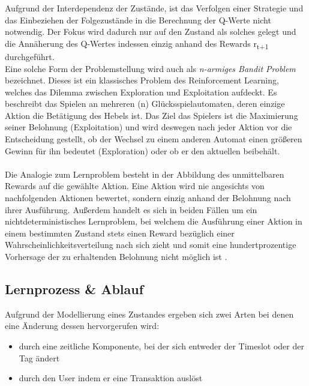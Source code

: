 Aufgrund der Interdependenz der Zustände, ist das Verfolgen einer Strategie und das Einbeziehen der Folgezustände in die Berechnung der Q-Werte nicht notwendig. Der Fokus wird dadurch nur auf den Zustand als solches gelegt und die Annäherung des  Q-Wertes indessen einzig anhand des Rewards r\textsubscript{t+1} durchgeführt. \\
Eine solche Form der Problemstellung wird auch als \textit{n-armiges Bandit Problem} bezeichnet. Dieses ist ein klassisches Problem des Reinforcement Learning, welches das Dilemma zwischen Exploration und Exploitation aufdeckt. Es beschreibt das Spielen an mehreren (n) Glücksspielautomaten, deren einzige Aktion die Betätigung des Hebels ist. Das Ziel das Spielers ist die Maximierung seiner Belohnung (Exploitation) und wird deswegen nach jeder Aktion vor die Entscheidung gestellt, ob der Wechsel zu einem anderen Automat einen größeren Gewinn für ihn bedeutet (Exploration) oder ob er den aktuellen beibehält. \\\\
Die Analogie zum Lernproblem besteht in der Abbildung des unmittelbaren Rewards auf die gewählte Aktion. Eine Aktion wird nie angesichts von nachfolgenden Aktionen bewertet, sondern einzig anhand der Belohnung nach ihrer Ausführung. Außerdem handelt es sich in beiden Fällen um ein nichtdeterministisches Lernproblem, bei welchem die Ausführung einer Aktion in einem bestimmten Zustand stets einen Reward bezüglich einer Wahrscheinlichkeitsverteilung nach sich zieht und somit eine hundertprozentige Vorhersage der zu erhaltenden Belohnung nicht möglich ist \cite{Sutton}.

\subsection{Lernprozess \& Ablauf}
\label{subsec:learning}

Aufgrund der Modellierung eines Zustandes ergeben sich zwei Arten bei denen eine Änderung dessen hervorgerufen wird: 
\begin{itemize}
	\item durch eine zeitliche Komponente, bei der sich entweder der Timeslot oder der Tag ändert
	\item durch den User indem er eine Transaktion auslöst
\end{itemize}

